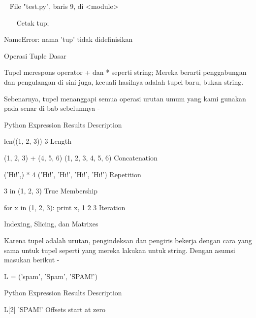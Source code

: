 ~ File "test.py", baris 9, di <module> \par
~~~ Cetak tup; \par
NameError: nama 'tup' tidak didefinisikan \par
Operasi Tuple Dasar \par
Tupel merespons operator + dan * seperti string; Mereka berarti penggabungan dan pengulangan di sini juga, kecuali hasilnya adalah tupel baru, bukan string. \par
Sebenarnya, tupel menanggapi semua operasi urutan umum yang kami gunakan pada senar di bab sebelumnya - \par
Python Expression \hspace*{0.5in} Results  \hspace*{0.5in} Description \par
len((1, 2, 3)) \hspace*{0.5in} 3 \hspace*{0.5in} Length \par
(1, 2, 3) + (4, 5, 6) \hspace*{0.5in} (1, 2, 3, 4, 5, 6) \hspace*{0.5in} Concatenation \par
('Hi!',) * 4 \hspace*{0.5in} ('Hi!', 'Hi!', 'Hi!', 'Hi!') \hspace*{0.5in} Repetition \par
3 in (1, 2, 3) \hspace*{0.5in} True \hspace*{0.5in} Membership \par
for x in (1, 2, 3): print x, \hspace*{0.5in} 1 2 3 \hspace*{0.5in} Iteration \par
Indexing, Slicing, dan Matrixes \par
Karena tupel adalah urutan, pengindeksan dan pengiris bekerja dengan cara yang sama untuk tupel seperti yang mereka lakukan untuk string. Dengan asumsi masukan berikut - \par
L = ('spam', 'Spam', 'SPAM!') \par
  \par
Python Expression \hspace*{0.5in} Results  \hspace*{0.5in} Description \par
L[2] \hspace*{0.5in} 'SPAM!' \hspace*{0.5in} Offsets start at zero \par

